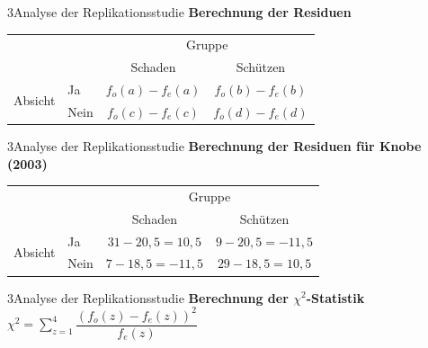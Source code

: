\documentclass[xcolor=table,9pt,aspectratio=169]{beamer}
\begin{document}
\begin{frame}{\vspace*{10mm}3\hspace*{1em}Analyse der Replikationsstudie}
\textbf{Berechnung der Residuen}\\
\smallskip
\begin{tabular}{llcc}
   \arrayrulecolor{blue2}\hline
                              &        & \multicolumn{2}{c}{Gruppe}                    \\
                              &        & Schaden               & Schützen              \\
   \hline
   \multirow{2}{*}{Absicht}   & Ja     & $f_{o}(a)-f_{e}(a)$   & $f_{o}(b)-f_{e}(b)$   \\
                              & Nein   & $f_{o}(c)-f_{e}(c)$   & $f_{o}(d)-f_{e}(d)$   \\
   \hline
\end{tabular}
\end{frame}


\begin{frame}{\vspace*{10mm}3\hspace*{1em}Analyse der Replikationsstudie}
\textbf{Berechnung der Residuen für Knobe (2003)}\\
\smallskip
\begin{tabular}{llcc}
   \arrayrulecolor{blue2}\hline
                              &        & \multicolumn{2}{c}{Gruppe}          \\
                              &        & Schaden          & Schützen         \\
   \hline
   \multirow{2}{*}{Absicht}   & Ja     & $31-20,5=10,5$   & $9-20,5=-11,5$   \\
                              & Nein   & $7-18,5=-11,5$   & $29-18,5=10,5$   \\
   \hline
\end{tabular}
\end{frame}


\begin{frame}{\vspace*{10mm}3\hspace*{1em}Analyse der Replikationsstudie}
\textbf{Berechnung der $\chi^{2}$-Statistik}\\
\smallskip
$\chi^{2}=\sum_{z=1}^{4}\dfrac{(f_{o}(z)-f_{e}(z))^{2}}{f_{e}(z)}$
\end{frame}
\end{document}
